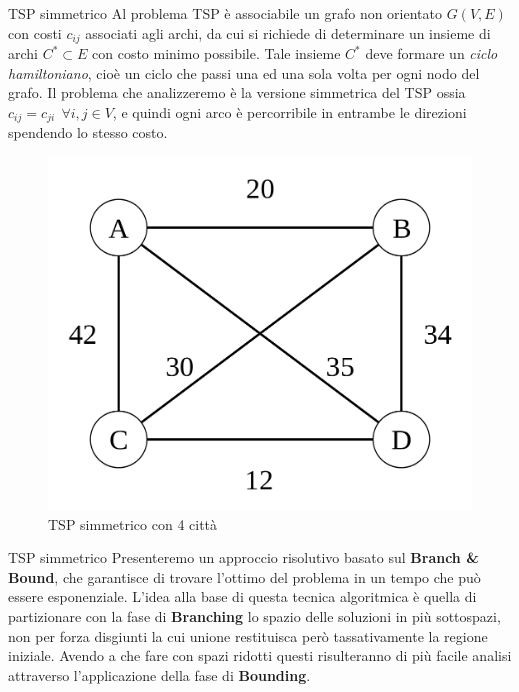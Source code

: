 \documentclass[10pt]{beamer}
\begin{document}
\begin{frame}{TSP simmetrico}
    Al problema TSP è associabile un grafo non orientato $G(V,E)$ con costi $c_{ij}$ associati agli archi, da cui si richiede di determinare un insieme di archi $C^* \subset E$ con costo minimo possibile. Tale insieme $C^*$ deve formare un \textit{ciclo hamiltoniano}, cioè un ciclo che passi una ed una sola volta per ogni nodo del grafo. Il problema che analizzeremo è la versione simmetrica del TSP ossia $c_{ij} = c_{ji} \:\: \forall i,j \in V$, e quindi ogni arco è percorribile in entrambe le direzioni spendendo lo stesso costo.
    \begin{figure}
        \centering
        \includegraphics[scale=0.11]{files/SimmetricTSP.png}
        \caption{TSP simmetrico con 4 città}
    \end{figure}
\end{frame}

\begin{frame}{TSP simmetrico}
    Presenteremo un approccio risolutivo basato sul \textbf{Branch \& Bound}, che garantisce di trovare l'ottimo del problema in un tempo che può essere esponenziale. L'idea alla base di questa tecnica algoritmica è quella di partizionare con la fase di \textbf{Branching} lo spazio delle soluzioni in più sottospazi, non per forza disgiunti la cui unione restituisca però tassativamente la regione iniziale. Avendo a che fare con spazi ridotti questi risulteranno di più facile analisi attraverso l'applicazione della fase di \textbf{Bounding}.
\end{frame}
\end{document}
